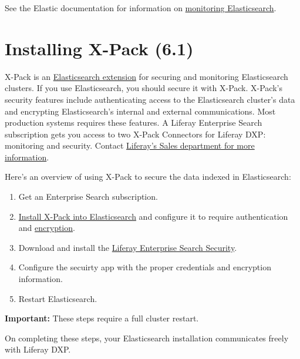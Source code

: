 See the Elastic documentation for information on
\href{https://www.elastic.co/guide/en/elasticsearch/reference/6.5/es-monitoring.html}{monitoring
Elasticsearch}.

\chapter{Installing X-Pack (6.1)}\label{installing-x-pack-6.1}

X-Pack is an
\href{https://www.elastic.co/guide/en/elasticsearch/reference/6.1/setup-xpack.html}{Elasticsearch
extension} for securing and monitoring Elasticsearch clusters. If you
use Elasticsearch, you should secure it with X-Pack. X-Pack's security
features include authenticating access to the Elasticsearch cluster's
data and encrypting Elasticsearch's internal and external
communications. Most production systems requires these features. A
Liferay Enterprise Search subscription gets you access to two X-Pack
Connectors for Liferay DXP: monitoring and security. Contact
\href{https://www.liferay.com/contact-us\#contact-sales}{Liferay's Sales
department for more information}.

Here's an overview of using X-Pack to secure the data indexed in
Elasticsearch:

\begin{enumerate}
\def\labelenumi{\arabic{enumi}.}
\item
  Get an Enterprise Search subscription.
\item
  \href{https://www.elastic.co/guide/en/x-pack/6.1/installing-xpack.html}{Install
  X-Pack into Elasticsearch} and configure it to require authentication
  and
  \href{https://www.elastic.co/guide/en/elasticsearch/reference/6.1/configuring-tls.html\#configuring-tls}{encryption}.
\item
  Download and install the
  \href{https://web.liferay.com/group/customer/dxp/downloads/enterprise-search}{Liferay
  Enterprise Search Security}.
\item
  Configure the secuirty app with the proper credentials and encryption
  information.
\item
  Restart Elasticsearch.
\end{enumerate}

\textbf{Important:} These steps require a full cluster restart.

On completing these steps, your Elasticsearch installation communicates
freely with Liferay DXP.

\noindent\hrulefill

